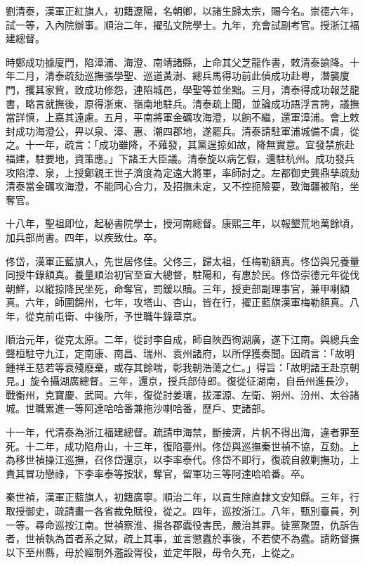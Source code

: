 \begin{pinyinscope}
劉清泰，漢軍正紅旗人，初籍遼陽，名朝卿，以諸生歸太宗，賜今名。崇德六年，試一等，入內院辦事。順治二年，擢弘文院學士。九年，充會試副考官。授浙江福建總督。

時鄭成功據廈門，陷漳浦、海澄、南靖諸縣，上命其父芝龍作書，敕清泰諭降。十年二月，清泰疏劾巡撫張學聖、巡道黃澍、總兵馬得功前此偵成功赴粵，潛襲廈門，攫其家貲，致成功修怨，連陷城邑，學聖等並坐黜。三月，清泰得成功報芝龍書，略言就撫後，原得浙東、嶺南地駐兵。清泰疏上聞，並論成功語浮言誇，議撫當詳慎，上嘉其遠慮。五月，平南將軍金礪攻海澄，以餉不繼，還軍漳浦。會上敕封成功海澄公，畀以泉、漳、惠、潮四郡地，遂罷兵。清泰請駐軍浦城備不虞，從之。十一年，疏言：「成功雖降，不薙發，其黨逞掠如故，降無實意。宜發禁旅赴福建，駐要地，資策應。」下諸王大臣議。清泰旋以病乞假，還駐杭州。成功發兵攻陷漳、泉，上授鄭親王世子濟度為定遠大將軍，率師討之。左都御史龔鼎孳疏劾清泰當金礪攻海澄，不能同心合力，及招撫未定，又不控扼險要，致海疆被陷，坐奪官。

十八年，聖祖即位，起秘書院學士，授河南總督。康熙三年，以報墾荒地萬餘頃，加兵部尚書。四年，以疾致仕。卒。

佟岱，漢軍正藍旗人，先世居佟佳。父佟三，歸太祖，任梅勒額真。佟岱與兄養量同授牛錄額真。養量順治初官至宣大總督，駐陽和，有惠於民。佟岱崇德元年從伐朝鮮，以縱掠降民坐死，命奪官，罰鍰以贖。三年，授吏部副理事官，兼甲喇額真。六年，師圍錦州，七年，攻塔山、杏山，皆在行，擢正藍旗漢軍梅勒額真。八年，從克前屯衛、中後所，予世職牛錄章京。

順治元年，從克太原。二年，從討李自成，師自陜西徇湖廣，遂下江南。與總兵金聲桓駐守九江，定南康、南昌、瑞州、袁州諸府，以所俘獲奏聞。因疏言：「故明鍾祥王慈若等衰殘廢棄，或存其餘喘，彰我朝浩蕩之仁。」得旨：「故明諸王赴京朝見。」旋令攝湖廣總督。三年，還京，授兵部侍郎。復從征湖南，自岳州進長沙，戰衡州，克寶慶、武岡。六年，復從討姜瓖，拔渾源、左衛、朔州、汾州、太谷諸城。世職累進一等阿達哈哈番兼拖沙喇哈番，歷戶、吏諸部。

十一年，代清泰為浙江福建總督。疏請申海禁，斷接濟，片帆不得出海，違者罪至死。十二年，成功陷舟山，十三年，復陷臺州。佟岱與巡撫秦世禎不協，互劾。上為移世禎操江巡撫，召佟岱還京，以李率泰代。佟岱不即行，復疏自敘剿撫功，上責其冒功戀祿，下李率泰等按狀，奪官，留軍功三等阿達哈哈番。卒。

秦世禎，漢軍正藍旗人，初籍廣寧。順治二年，以貢生除直隸文安知縣。三年，行取授御史，疏請畫一各省裁免賦役，從之。四年，巡按浙江。八年，甄別臺員，列一等。尋命巡按江南。世禎察淮、揚各郡蠹役害民，嚴治其罪。徒黨聚盟，仇訴告者，世禎執為首者系之獄，疏上其事，並言懲蠹於事後，不若使不為蠹。請飭督撫以下至州縣，毋於經制外濫設胥役，並定年限，毋令久充，上從之。


\end{pinyinscope}
